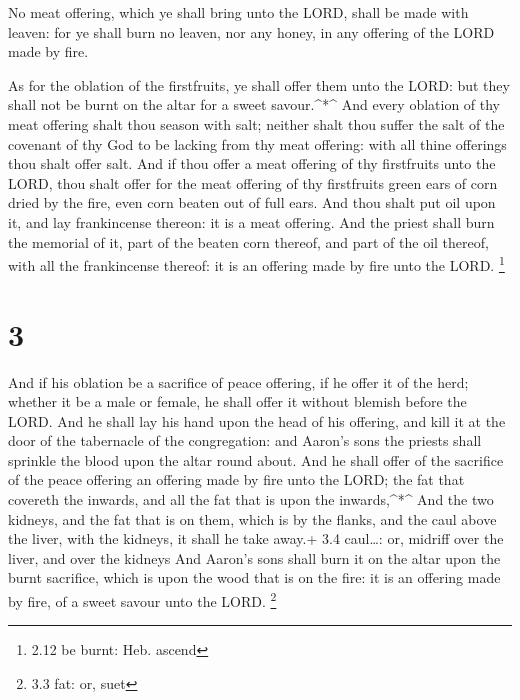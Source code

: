  No meat offering, which ye shall bring unto the LORD,
shall be made with leaven: for ye shall burn no leaven, nor any honey,
in any offering of the LORD made by fire.

 As for the oblation of the firstfruits, ye shall offer
them unto the LORD: but they shall not be burnt on the altar for a sweet
savour.\^{}*\^{}  And every oblation of thy meat offering
shalt thou season with salt; neither shalt thou suffer the salt of the
covenant of thy God to be lacking from thy meat offering: with all thine
offerings thou shalt offer salt.  And if thou offer a meat
offering of thy firstfruits unto the LORD, thou shalt offer for the meat
offering of thy firstfruits green ears of corn dried by the fire, even
corn beaten out of full ears.  And thou shalt put oil upon
it, and lay frankincense thereon: it is a meat offering. 
And the priest shall burn the memorial of it, part of the beaten corn
thereof, and part of the oil thereof, with all the frankincense thereof:
it is an offering made by fire unto the LORD. \footnote{2.12 be burnt:
  Heb. ascend}

\hypertarget{section-2}{%
\section{3}\label{section-2}}

 And if his oblation be a sacrifice of peace offering, if he
offer it of the herd; whether it be a male or female, he shall offer it
without blemish before the LORD.  And he shall lay his hand
upon the head of his offering, and kill it at the door of the tabernacle
of the congregation: and Aaron's sons the priests shall sprinkle the
blood upon the altar round about.  And he shall offer of the
sacrifice of the peace offering an offering made by fire unto the LORD;
the fat that covereth the inwards, and all the fat that is upon the
inwards,\^{}*\^{}  And the two kidneys, and the fat that is
on them, which is by the flanks, and the caul above the liver, with the
kidneys, it shall he take away.+ 3.4 caul\ldots: or, midriff over the
liver, and over the kidneys  And Aaron's sons shall burn it
on the altar upon the burnt sacrifice, which is upon the wood that is on
the fire: it is an offering made by fire, of a sweet savour unto the
LORD. \footnote{3.3 fat: or, suet}

